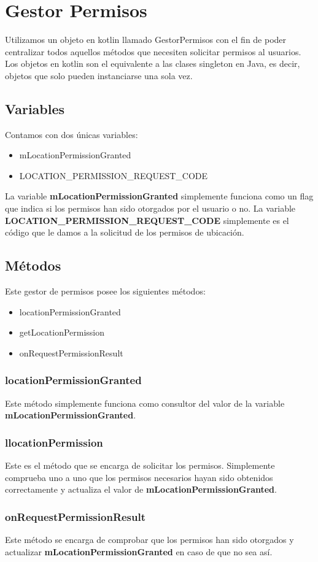 \section{Gestor Permisos}
Utilizamos un objeto en kotlin llamado GestorPermisos con el fin de poder centralizar todos aquellos métodos que necesiten solicitar permisos al usuarios. Los objetos en kotlin son el equivalente a las clases singleton en Java, es decir, objetos que solo pueden instanciarse una sola vez.

\subsection{Variables}
Contamos con dos únicas variables:

\begin{itemize}
	\item mLocationPermissionGranted
	\item LOCATION\_PERMISSION\_REQUEST\_CODE
\end{itemize}

La variable \textbf{mLocationPermissionGranted} simplemente funciona como un flag que indica si los permisos han sido otorgados por el usuario o no. La variable \textbf{LOCATION\_PERMISSION\_REQUEST\_CODE} simplemente es el código que le damos a la solicitud de los permisos de ubicación.

\subsection{Métodos}

Este gestor de permisos posee los siguientes métodos:

\begin{itemize}
	\item locationPermissionGranted
	\item getLocationPermission
	\item onRequestPermissionResult
\end{itemize}


\subsubsection{locationPermissionGranted}
Este método simplemente funciona como consultor del valor de la variable \textbf{mLocationPermissionGranted}.

\subsubsection{llocationPermission}
Este es el método que se encarga de solicitar los permisos. Simplemente comprueba uno a uno que los permisos necesarios hayan sido obtenidos correctamente y actualiza el valor de \textbf{mLocationPermissionGranted}.

\subsubsection{onRequestPermissionResult}
Este método se encarga de comprobar que los permisos han sido otorgados y actualizar \textbf{mLocationPermissionGranted} en caso de que no sea así.


